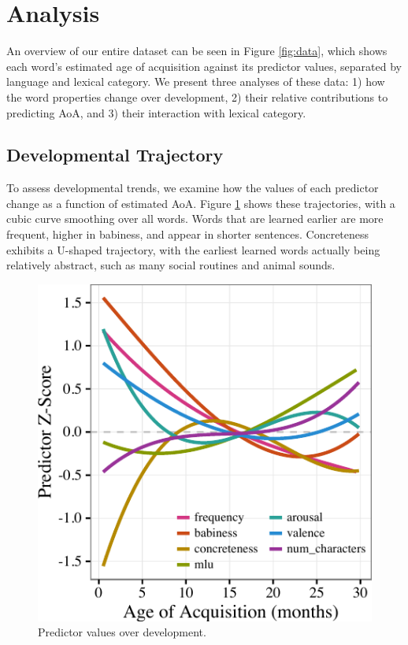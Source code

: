 \documentclass[10pt, letterpaper]{article}
\newenvironment{CodeChunk}{}{}
\begin{document}
\newpage

\section{Analysis}\label{analysis}

An overview of our entire dataset can be seen in Figure \ref{fig:data},
which shows each word's estimated age of acquisition against its
predictor values, separated by language and lexical category. We present
three analyses of these data: 1) how the word properties change over
development, 2) their relative contributions to predicting AoA, and 3)
their interaction with lexical category.

\subsection{Developmental Trajectory}\label{developmental-trajectory}

To assess developmental trends, we examine how the values of each
predictor change as a function of estimated AoA. Figure \ref{fig:devo}
shows these trajectories, with a cubic curve smoothing over all words.
Words that are learned earlier are more frequent, higher in babiness,
and appear in shorter sentences. Concreteness exhibits a U-shaped
trajectory, with the earliest learned words actually being relatively
abstract, such as many social routines and animal sounds.

\begin{CodeChunk}
\begin{figure}[tb]

{\centering \includegraphics{figs/devo-1} 

}

\caption[Predictor values over development]{Predictor values over development.}\label{fig:devo}
\end{figure}
\end{CodeChunk}
\end{document}

